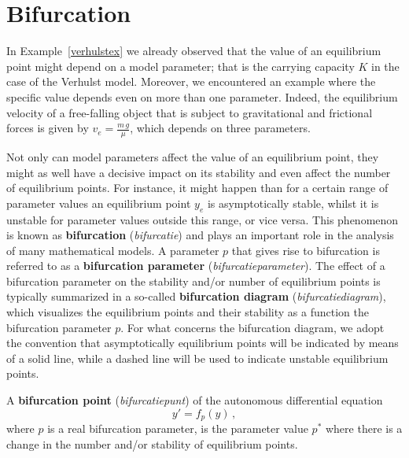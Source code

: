 \section{Bifurcation}
In Example~\ref{verhulstex} we already observed that the value of an equilibrium point might depend on a model parameter; that is the carrying capacity $K$ in the case of the Verhulst model.  Moreover, we encountered an example where the specific value depends even on more than one parameter. Indeed, the equilibrium velocity of a free-falling object that is subject to gravitational and frictional forces is given by $v_e=\frac{m\,g}{\mu}$, which depends on three parameters. 

Not only can model parameters affect the value of an equilibrium point, they might as well have a decisive impact on its stability and even affect the number of equilibrium points. For instance, it might happen than for a certain range of parameter values an equilibrium point $y_e$ is asymptotically stable, whilst it is unstable for parameter values outside this range, or vice versa. This phenomenon is known as \textbf{bifurcation} (\textit{bifurcatie}) and plays an important role in the analysis of many mathematical models. A parameter $p$ that gives rise to bifurcation is referred to as a \textbf{bifurcation parameter} (\textit{bifurcatieparameter}). The effect of a bifurcation parameter on the stability and/or number of equilibrium points is typically summarized in a so-called \textbf{bifurcation diagram} (\textit{bifurcatiediagram}), which visualizes the equilibrium points and their stability as a function the bifurcation parameter $p$. For what concerns the bifurcation diagram, we adopt the convention that asymptotically equilibrium points will be indicated by means of a solid line, while a dashed line will be used to indicate unstable equilibrium points. 

\begin{definition} 
A \textbf{bifurcation point} (\textit{bifurcatiepunt}) of the autonomous differential equation
$$
y'=f_p\left(y\right)\,,
$$
where $p$ is a real bifurcation parameter, is the parameter value $p^*$ where there is a change in the number and/or stability of equilibrium points. 
\end{definition}

